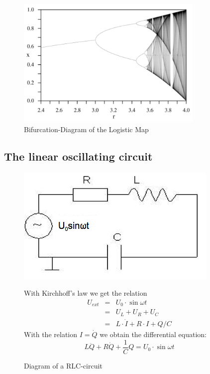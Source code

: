 \begin{figure}[H]
\centering \includegraphics[width=0.8\textwidth]{Bilder/logmap.png}
\caption{Bifurcation-Diagram of the Logistic Map}
\end{figure}


\subsection{The linear oscillating circuit}
\begin{figure}[H]
\begin{minipage}{0.5\textwidth}
\includegraphics[width=\textwidth]{Bilder/lincirc.png}
\caption{Diagram of a RLC-circuit}
\end{minipage}
\begin{minipage}{0.5\textwidth}
With Kirchhoff's law we get the relation \begin{eqnarray*}  
U_{ext} &=& U_0\cdot\sin\omega t \\
&=& U_L + U_R + U_C\\
&=& L\cdot \dot I + R\cdot I + Q/C
\end{eqnarray*}
With the relation $I = \dot Q$ we obtain the differential equation:
$$ L\ddot Q + R \dot Q + \frac{1}{C}Q = U_0\cdot\sin \omega t $$
\end{minipage}
\end{figure}

